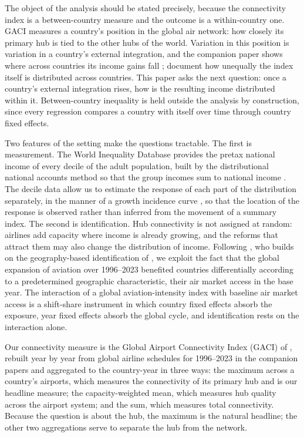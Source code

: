 The object of the analysis should be stated precisely, because the connectivity index is a between-country measure and the outcome is a within-country one. GACI measures a country's position in the global air network: how closely its primary hub is tied to the other hubs of the world. Variation in this position is variation in a country's external integration, and the companion paper shows where across countries its income gains fall \citep{Yue_2026}; \citet{Sun_2024} document how unequally the index itself is distributed across countries. This paper asks the next question: once a country's external integration rises, how is the resulting income distributed within it. Between-country inequality is held outside the analysis by construction, since every regression compares a country with itself over time through country fixed effects.

Two features of the setting make the questions tractable. The first is measurement. The World Inequality Database provides the pretax national income of every decile of the adult population, built by the distributional national accounts method so that the group incomes sum to national income \citep{Piketty_2017,WID_2024}. The decile data allow us to estimate the response of each part of the distribution separately, in the manner of a growth incidence curve \citep{Ravallion_2003}, so that the location of the response is observed rather than inferred from the movement of a summary index. The second is identification. Hub connectivity is not assigned at random: airlines add capacity where income is already growing, and the reforms that attract them may also change the distribution of income. Following \citet{Feyrer_2019}, who builds on the geography-based identification of \citet{Frankel_1999}, we exploit the fact that the global expansion of aviation over 1996--2023 benefited countries differentially according to a predetermined geographic characteristic, their air market access in the base year. The interaction of a global aviation-intensity index with baseline air market access is a shift-share instrument \citep{GoldsmithPinkham_2020,Adao_2019,Borusyak_2022} in which country fixed effects absorb the exposure, year fixed effects absorb the global cycle, and identification rests on the interaction alone.

Our connectivity measure is the Global Airport Connectivity Index (GACI) of \citet{Cheung_2020}, rebuilt year by year from global airline schedules for 1996--2023 in the companion papers and aggregated to the country-year in three ways: the maximum across a country's airports, which measures the connectivity of its primary hub and is our headline measure; the capacity-weighted mean, which measures hub quality across the airport system; and the sum, which measures total connectivity. Because the question is about the hub, the maximum is the natural headline; the other two aggregations serve to separate the hub from the network.


